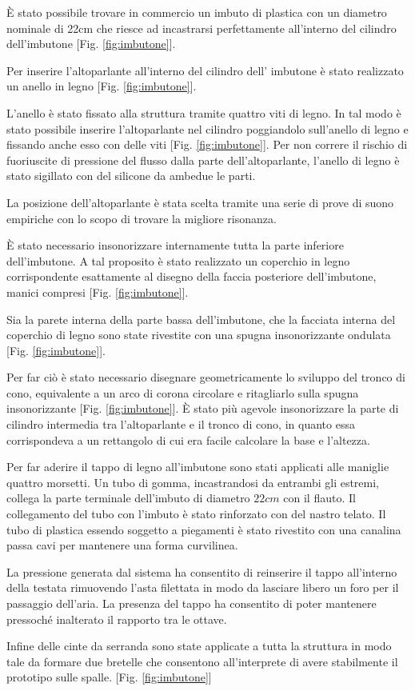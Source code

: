 È stato possibile trovare in commercio un imbuto di plastica con un diametro nominale di 22cm che riesce ad incastrarsi perfettamente all’interno del cilindro dell’imbutone [Fig. \ref{fig:imbutone}].

Per inserire l’altoparlante all’interno del cilindro dell’ imbutone è stato realizzato un anello in legno [Fig. \ref{fig:imbutone}].

L’anello è stato fissato alla struttura tramite quattro viti di legno. In tal modo è stato possibile inserire l’altoparlante nel cilindro poggiandolo sull’anello di legno e fissando anche esso con delle viti [Fig. \ref{fig:imbutone}]. Per non correre il rischio di fuoriuscite di pressione del flusso dalla parte dell’altoparlante, l’anello di legno è stato sigillato con del silicone da ambedue le parti.

La posizione dell’altoparlante è stata scelta tramite una serie di prove di suono empiriche con lo scopo di trovare la migliore risonanza.

È stato necessario insonorizzare internamente tutta la parte inferiore dell’imbutone. A tal proposito è stato realizzato un coperchio in legno corrispondente esattamente al disegno della faccia posteriore dell’imbutone, manici compresi [Fig. \ref{fig:imbutone}].

Sia la parete interna della parte bassa dell’imbutone, che la facciata interna del coperchio di legno sono state rivestite con una spugna insonorizzante ondulata [Fig. \ref{fig:imbutone}].

Per far ciò è stato necessario disegnare geometricamente lo sviluppo del tronco di cono, equivalente a un arco di corona circolare e ritagliarlo sulla spugna insonorizzante [Fig. \ref{fig:imbutone}]. È stato più agevole insonorizzare la parte di cilindro intermedia tra l’altoparlante e il tronco di cono, in quanto essa corrispondeva a un rettangolo di cui era facile calcolare la base e l’altezza.

Per far aderire il tappo di legno all’imbutone sono stati applicati alle maniglie quattro morsetti.
Un tubo di gomma, incastrandosi da entrambi gli estremi, collega la parte terminale dell’imbuto di diametro $22 cm$ con il flauto. Il collegamento del tubo con l’imbuto è stato rinforzato con del nastro telato. Il tubo di plastica essendo soggetto a piegamenti è stato rivestito con una canalina passa cavi per mantenere una forma curvilinea.

La pressione generata dal sistema ha consentito di reinserire il tappo all’interno della testata  rimuovendo l’asta filettata  in modo da lasciare libero un foro per il passaggio dell’aria. La presenza del tappo ha consentito di poter mantenere pressoché inalterato  il rapporto tra le ottave.

Infine delle cinte da serranda sono state applicate a tutta la struttura in modo tale da formare due bretelle che consentono all’interprete di avere stabilmente il prototipo sulle spalle. [Fig. \ref{fig:imbutone}]



